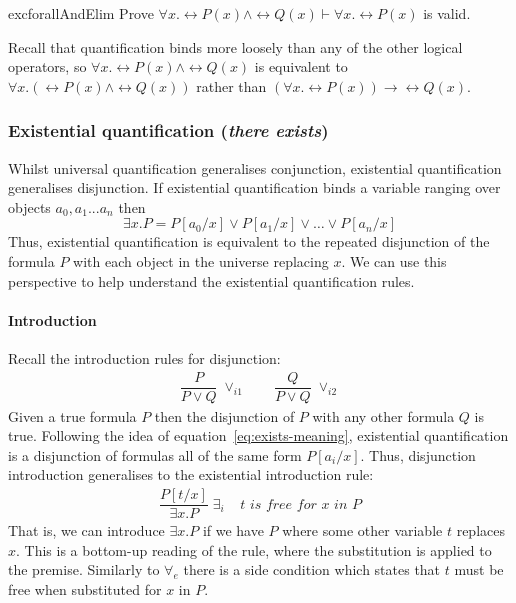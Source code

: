 \begin{restatable}{exc}{forallAndElim}
  Prove $\forall x . \rel{P}(x) \wedge \rel{Q}(x) \vdash \forall x
  . \rel{P}(x)$ is valid.
\end{restatable}
%
\begin{remark}
Recall that quantification binds more loosely than
any of the other logical operators, so $\forall x . \rel{P}(x)
\wedge \rel{Q}(x)$ is equivalent to $\forall x . (\rel{P}(x) \wedge
\rel{Q}(x))$ rather than $(\forall x . \rel{P} (x)) \rightarrow
\rel{Q}(x)$.
\end{remark}

\subsubsection{Existential quantification (\emph{there exists})}

Whilst universal quantification generalises conjunction,
existential quantification generalises disjunction.
If existential quantification binds a variable ranging
over objects $a_0, a_1 ... a_n$ then
%
\begin{equation}
\exists x . P = P[a_0/x] \vee P[a_1/x] \vee
\ldots \vee P[a_{n}/x]
\label{eq:exists-meaning}
\end{equation}
%
Thus, existential quantification is equivalent to the repeated
disjunction of the formula $P$ with each object in the universe
replacing $x$. We can use this perspective to help understand the
existential quantification rules.

\paragraph{Introduction} Recall the introduction rules for disjunction:
%
\begin{align*}
    \dfrac{P}
  {P \vee Q} \; {\vee_{i1}}
  \qquad
    \dfrac{Q}
  {P \vee Q} \; {\vee_{i2}}
\end{align*}
%
Given a true formula $P$ then the disjunction of $P$ with any other
formula $Q$ is true. Following the idea of
equation~\eqref{eq:exists-meaning}, existential quantification is a
disjunction of formulas all of the same form $P[a_i/x]$.  Thus,
disjunction introduction generalises to the existential
introduction rule:
%
\begin{align*}
\dfrac{P[t/x]}{\exists x . P} \; \exists_i \;\;\;\;
\textit{$t$ is free for $x$ in $P$}
\end{align*}
%
That is, we can introduce $\exists x . P$ if we have
$P$ where some other variable $t$ replaces $x$. This
is a bottom-up reading of the rule, where the substitution
is applied to the premise. Similarly to $\forall_e$ there is a
side condition which states that $t$ must be free when substituted
for $x$ in $P$.

